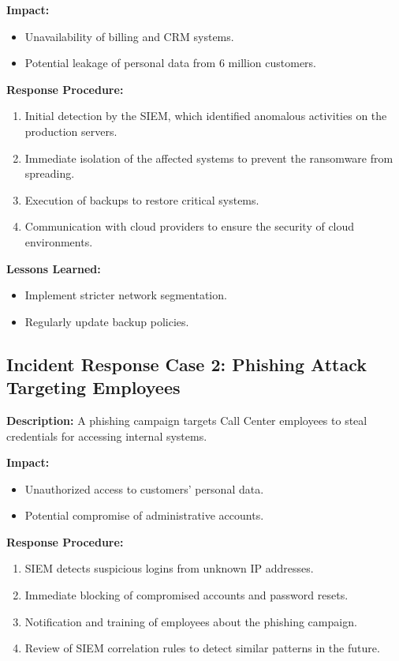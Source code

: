 \textbf{Impact:}  
\begin{itemize}
    \item Unavailability of billing and CRM systems.
    \item Potential leakage of personal data from 6 million customers.
\end{itemize}

\textbf{Response Procedure:}
\begin{enumerate}
    \item Initial detection by the SIEM, which identified anomalous activities on the production servers.
    \item Immediate isolation of the affected systems to prevent the ransomware from spreading.
    \item Execution of backups to restore critical systems.
    \item Communication with cloud providers to ensure the security of cloud environments.
\end{enumerate}

\textbf{Lessons Learned:}
\begin{itemize}
    \item Implement stricter network segmentation.
    \item Regularly update backup policies.
\end{itemize}

\subsection{Incident Response Case 2: Phishing Attack Targeting Employees}

\textbf{Description:}  
A phishing campaign targets Call Center employees to steal credentials for accessing internal systems.

\textbf{Impact:}  
\begin{itemize}
    \item Unauthorized access to customers' personal data.
    \item Potential compromise of administrative accounts.
\end{itemize}

\textbf{Response Procedure:}
\begin{enumerate}
    \item SIEM detects suspicious logins from unknown IP addresses.
    \item Immediate blocking of compromised accounts and password resets.
    \item Notification and training of employees about the phishing campaign.
    \item Review of SIEM correlation rules to detect similar patterns in the future.
\end{enumerate}

